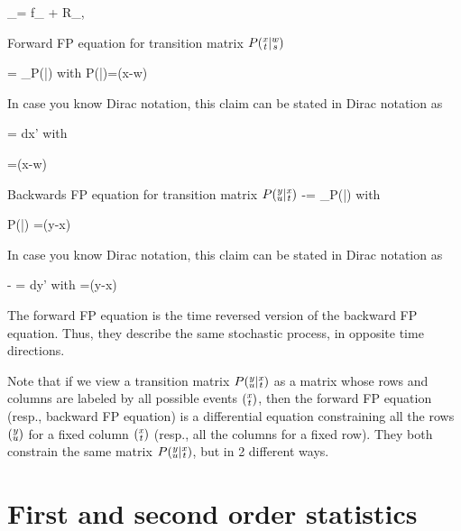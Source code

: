 \beq
\calb_\rvx \bullet=
f_\mu{}
 + R_{\mu, \nu}
\eeq



\begin{claim} Forward FP equation for transition matrix $ P(\substack{x\\t}|\substack{w\\s})$
	
\beq
{}=
\calf_\rvx P(|)
\eeq
with
\beq
P(|)=\delta(x-w)
\eeq

In case you know Dirac notation, this claim can be stated in Dirac notation as

\beq
{}
=\int 
{}dx'
\eeq
with

\beq
{} =\delta(x-w)
\quad {}
\eeq
\end{claim}


	
	
\begin{claim} Backwards FP equation for transition matrix $P(\substack{y\\u}|\substack{x\\t})$
\beq
-\;=
\calb_\rvx P(|)
\eeq
with

\beq
P(|) =\delta(y-x)
\eeq

In case you know Dirac notation, this claim can be stated in Dirac notation as

\beq
-\; 
=\int 
{}dy'
\eeq
with
\beq
{}=\delta(y-x)
\quad {}
\eeq
	
\end{claim}

The forward FP equation is the
time reversed version of the 
backward FP equation. Thus, they describe 
the same stochastic process,
in opposite time directions.

Note that if we view
a transition matrix 
$P(\substack{y\\u}|\substack{x\\t})$  as a matrix whose rows and columns are labeled by 
all possible events $(\substack{x\\t})$, then the forward FP equation (resp., backward FP equation)
is a differential equation
constraining all the rows $(\substack{y\\u})$ for a fixed column
$(\substack{x\\t})$
(resp., all the columns for a fixed row).
They both constrain
the same matrix $P(\substack{y\\u}|\substack{x\\t})$,
but in 2 different ways.

	






\section{First and second order statistics}
